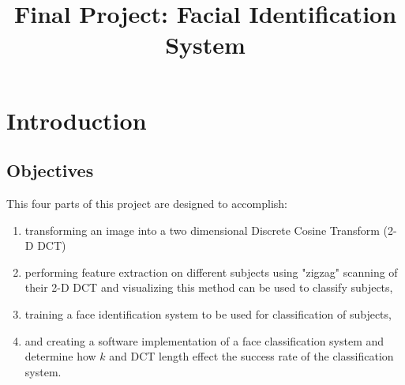 \documentclass[conference]{IEEEtran}
\begin{document}
\title{Final Project: Facial Identification System}
\author{
}\maketitle \IEEEpeerreviewmaketitle

\tableofcontents

\section{Introduction}

\subsection{Objectives}
This four parts of this project are designed to accomplish:
\begin{enumerate}
\item
    transforming an image into a two dimensional Discrete Cosine Transform (2-D DCT)

\item
    performing feature extraction on different subjects using "zigzag" scanning
    of their 2-D DCT and visualizing this method can be used to classify
    subjects,

\item
    training a face identification system to be used for classification of
    subjects,

\item
    and creating a software implementation of a face classification system and
    determine how $k$ and DCT length effect the success rate of the
    classification system.

\end{enumerate}
\end{document}

